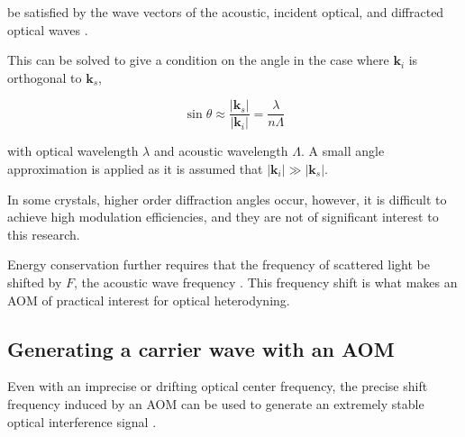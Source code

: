 \noindent be satisfied by the wave vectors of the acoustic, incident optical, and diffracted optical waves \cite{haus}.

This can be solved to give a condition on the angle in the case where $\mathbf{k}_i$ is orthogonal to $\mathbf{k}_s$,

\begin{equation} 
\sin{\theta} \approx \frac{|\mathbf{k}_s|}{|\mathbf{k}_i|} = \frac{\lambda}{n\Lambda}
\end{equation}

\noindent with optical wavelength $\lambda$ and acoustic wavelength $\Lambda$. A small angle approximation is applied as it is assumed that $|\mathbf{k}_i| \gg |\mathbf{k}_s|$.

In some crystals, higher order diffraction angles occur, however, it is difficult to achieve high modulation efficiencies, and they are not of significant interest to this research.






Energy conservation further requires that the frequency of scattered light be shifted by $F$, the acoustic wave frequency \cite{haus}. This frequency shift is what makes an AOM of practical interest for optical heterodyning.

\subsection{Generating a carrier wave with an AOM}
\label{sec:aom_carrier}

Even with an imprecise or drifting optical center frequency, the precise shift frequency induced by an AOM can be used to generate an extremely stable optical interference signal \cite{hitzenberger}. 

